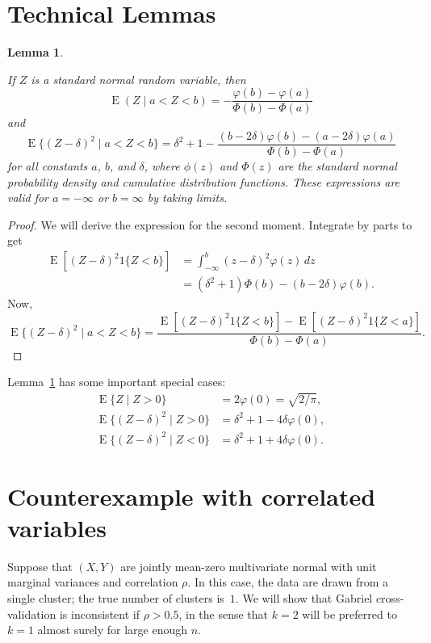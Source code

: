 \documentclass[11pt]{article}
\newtheorem{lemma}{Lemma}
\newcommand{\E}{\operatorname{E}}
\begin{document}
\section{Technical Lemmas}

\begin{lemma}\label{lem:truncated-normal-moments}

If $Z$ is a standard normal random variable, then
\[
  \E(Z \mid a < Z < b)
    = - \frac{\varphi(b) - \varphi(a)}
             {\Phi(b) - \Phi(a)}
\]
and
\[
  \E\{(Z - \delta)^2 \mid a < Z < b\}
    = \delta^2 + 1
    - \frac{  (b - 2 \delta) \varphi(b)
            - (a - 2 \delta) \varphi(a)}
           {\Phi(b) - \Phi(a)}
\]
for all constants $a$, $b$, and $\delta$, where
$\phi(z)$ and $\Phi(z)$ are the standard normal probability density and
cumulative distribution functions.  These expressions are valid
for $a = -\infty$ or $b = \infty$ by taking limits.

\end{lemma}
\begin{proof}
We will derive the expression for the second moment.
Integrate by parts to get
\begin{align*}
  \E[ (Z - \delta)^2 1\{Z < b\}]
    &= \int_{-\infty}^b (z - \delta)^2 \varphi(z) \, dz \\
    &= (\delta^2 + 1) \Phi(b) - (b - 2 \delta) \varphi(b).
\end{align*}
Now,
\[
  \E\{(Z - \delta)^2 \mid a < Z < b\}
    =
    \frac{  \E[ (Z - \delta)^2 1\{Z < b\}]
          - \E[ (Z - \delta)^2 1\{Z < a\}]}
         { \Phi(b) - \Phi(a) }.
\]
\end{proof}

Lemma~\ref{lem:truncated-normal-moments} has some important special cases:
\begin{align*}
  \E\{Z \mid Z > 0\} &= 2 \varphi(0) = \sqrt{2 / \pi}, \\
  \E\{(Z - \delta)^2 \mid Z > 0 \}
    &= \delta^2 + 1 - 4 \delta \varphi(0), \\
  \E\{(Z - \delta)^2 \mid Z < 0 \}
    &= \delta^2 + 1 + 4 \delta \varphi(0).
\end{align*}

\section{Counterexample with correlated variables}

Suppose that $(X, Y)$ are jointly mean-zero multivariate normal with unit
marginal variances and correlation $\rho$.  In this case, the data are drawn
from a single cluster; the true number of clusters is~$1$.  We will show that
Gabriel cross-validation is inconsistent if $\rho > 0.5$, in the sense that
$k = 2$ will be preferred to $k = 1$ almost surely for large enough $n$.
\end{document}
